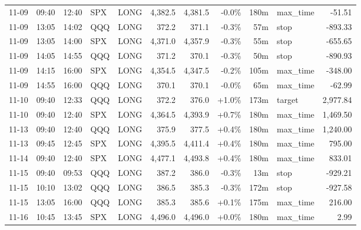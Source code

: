 \documentclass[11pt,a4paper,twoside]{article}
\begin{document}
\begin{center}
\begin{longtable}{>{\color{txtmain}}l l l l l r r r r >{\color{txtmain}}l r}
11-09 & 09:40 & 12:40 & SPX & LONG & 4,382.5 & 4,381.5 & \textcolor{lossred}{-0.0\%} & 180m & max\_time & \textcolor{lossred}{-51.51} \\
11-09 & 13:05 & 14:02 & QQQ & LONG & 372.2 & 371.1 & \textcolor{lossred}{-0.3\%} & 57m & stop & \textcolor{lossred}{-893.33} \\
11-09 & 13:05 & 14:00 & SPX & LONG & 4,371.0 & 4,357.9 & \textcolor{lossred}{-0.3\%} & 55m & stop & \textcolor{lossred}{-655.65} \\
11-09 & 14:05 & 14:55 & QQQ & LONG & 371.2 & 370.1 & \textcolor{lossred}{-0.3\%} & 50m & stop & \textcolor{lossred}{-890.93} \\
11-09 & 14:15 & 16:00 & SPX & LONG & 4,354.5 & 4,347.5 & \textcolor{lossred}{-0.2\%} & 105m & max\_time & \textcolor{lossred}{-348.00} \\
11-09 & 14:55 & 16:00 & QQQ & LONG & 370.1 & 370.1 & \textcolor{lossred}{-0.0\%} & 65m & max\_time & \textcolor{lossred}{-62.99} \\
11-10 & 09:40 & 12:33 & QQQ & LONG & 372.2 & 376.0 & \textcolor{wingreen}{+1.0\%} & 173m & target & \textcolor{wingreen}{2,977.84} \\
11-10 & 09:40 & 12:40 & SPX & LONG & 4,364.5 & 4,393.9 & \textcolor{wingreen}{+0.7\%} & 180m & max\_time & \textcolor{wingreen}{1,469.50} \\
11-13 & 09:40 & 12:40 & QQQ & LONG & 375.9 & 377.5 & \textcolor{wingreen}{+0.4\%} & 180m & max\_time & \textcolor{wingreen}{1,240.00} \\
11-13 & 09:45 & 12:45 & SPX & LONG & 4,395.5 & 4,411.4 & \textcolor{wingreen}{+0.4\%} & 180m & max\_time & \textcolor{wingreen}{795.00} \\
11-14 & 09:40 & 12:40 & SPX & LONG & 4,477.1 & 4,493.8 & \textcolor{wingreen}{+0.4\%} & 180m & max\_time & \textcolor{wingreen}{833.01} \\
11-15 & 09:40 & 09:53 & QQQ & LONG & 387.2 & 386.0 & \textcolor{lossred}{-0.3\%} & 13m & stop & \textcolor{lossred}{-929.21} \\
11-15 & 10:10 & 13:02 & QQQ & LONG & 386.5 & 385.3 & \textcolor{lossred}{-0.3\%} & 172m & stop & \textcolor{lossred}{-927.58} \\
11-15 & 13:05 & 16:00 & QQQ & LONG & 385.3 & 385.6 & \textcolor{wingreen}{+0.1\%} & 175m & max\_time & \textcolor{wingreen}{216.00} \\
11-16 & 10:45 & 13:45 & SPX & LONG & 4,496.0 & 4,496.0 & \textcolor{wingreen}{+0.0\%} & 180m & max\_time & \textcolor{wingreen}{2.99} \\

\end{longtable}
\end{center}
\end{document}
